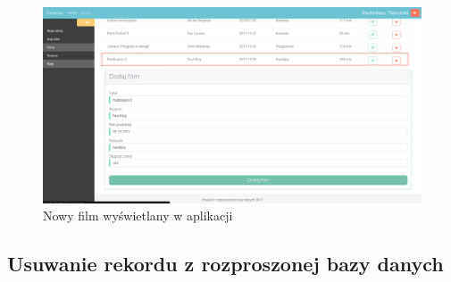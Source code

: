 \begin{figure} [H]
	\centering
	\includegraphics[width=1\linewidth]{rozdzial06/6.png}
	\caption{Nowy film wyświetlany w aplikacji}
	\label{fig:endAddFilm}
\end{figure}

\subsection{Usuwanie rekordu z rozproszonej bazy danych}



